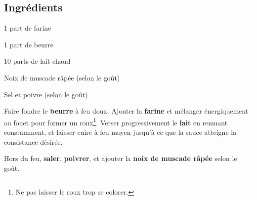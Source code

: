 \newpage
{}
\label{sauce_bechamel}

\subsection*{Ingrédients}
\begin{ingredients}
	\item 1 part de farine
	\item 1 part de beurre
	\item 10 parts de lait chaud
	\item Noix de muscade râpée (selon le goût)
	\item Sel et poivre (selon le goût)
\end{ingredients}

\medskip

Faire fondre le \textbf{beurre} à feu doux.
Ajouter la \textbf{farine} et mélanger énergiquement au fouet pour former un roux\footnote{Ne pas laisser le roux trop se colorer.}.
Verser progressivement le \textbf{lait} en remuant constamment, et laisser cuire à feu moyen jusqu'à ce que la sauce atteigne la consistance désirée. 

Hors du feu, \textbf{saler}, \textbf{poivrer}, et ajouter la \textbf{noix de muscade râpée} selon le goût. 

\vspace*{0.75 cm}

\begin{recipeblock}
	
\end{recipeblock}